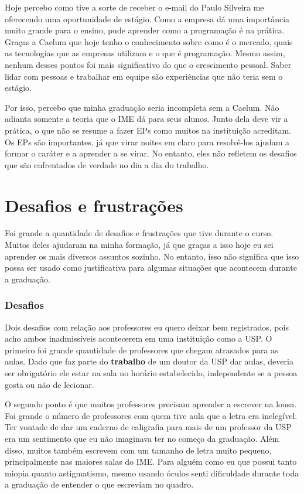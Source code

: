 \documentclass[titlepage,a4paper]{article}
\begin{document}
Hoje percebo como tive a sorte de receber o e-mail do Paulo Silveira me oferecendo uma oportunidade de estágio. Como a empresa dá uma importância muito grande para o ensino, pude aprender como a programação é na prática. Graças a Caelum que hoje tenho o conhecimento sobre como é o mercado, quais as tecnologias que as empresas utilizam e o que é programação. Mesmo assim, nenhum desses pontos foi mais significativo do que o crescimento pessoal. Saber lidar com pessoas e trabalhar em equipe são experiências que não teria sem o estágio.

Por isso, percebo que minha graduação seria incompleta sem a Caelum. Não adianta somente a teoria que o IME dá para seus alunos. Junto dela deve vir a prática, o que não se resume a fazer EPs como muitos na instituição acreditam. Os EPs são importantes, já que virar noites em claro para resolvê-los ajudam a formar o caráter e a aprender a se virar. No entanto, eles não refletem os desafios que são enfrentados de verdade no dia a dia do trabalho.

\section{Desafios e frustrações}

Foi grande a quantidade de desafios e frustrações que tive durante o curso. Muitos deles ajudaram na minha formação, já que graças a isso hoje eu sei aprender os mais diversos assuntos sozinho. No entanto, isso não significa que isso possa ser usado como justificativa para algumas situações que acontecem durante a graduação.

\subsubsection*{Desafios}

Dois desafios com relação aos professores eu quero deixar bem registrados, pois acho ambos inadmissíveis acontecerem em uma instituição como a USP. O primeiro foi grande quantidade de professores que chegam atrasados para as aulas. Dado que faz parte do \textbf{trabalho} de um doutor da USP dar aulas, deveria  ser obrigatório ele estar na sala no horário estabelecido, independente se a pessoa gosta ou não de lecionar.

O segundo ponto é que muitos professores precisam aprender a escrever na lousa. Foi grande o número de professores com quem tive aula que a letra era inelegível. Ter vontade de dar um caderno de caligrafia para mais de um professor da USP era um sentimento que eu não imaginava ter no começo da graduação. Além disso, muitos também escrevem com um tamanho de letra muito pequeno, principalmente nas maiores salas do IME. Para alguém como eu que possui tanto miopia quanto astigmatismo, mesmo usando óculos senti dificuldade durante toda a graduação de entender o que escreviam no quadro.
\end{document}
